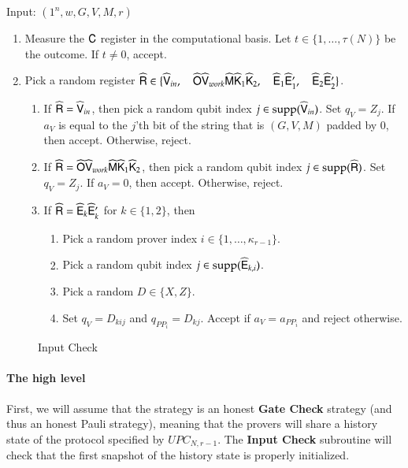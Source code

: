 \vspace{10pt}
\begin{center}
\begin{mdframed}
    Input: $(1^n,w,G,V,M,r)$ \\
	\begin{enumerate}
		\item Measure the ${\mathsf{C}}$ register in the computational basis. Let $t \in \{1,\ldots,\tau(N)\}$ be the outcome. If $t \neq 0$, accept.
		
		\item Pick a random register $\widehat{{\mathsf{R}}} \in \{ \widehat{{\mathsf{V}}}_{in}, \quad \widehat{{\mathsf{O}}} \widehat{{\mathsf{V}}}_{work} \widehat{{\mathsf{M}}} \widehat{{\mathsf{K}}}_1 \widehat{{\mathsf{K}}}_2, \quad \widehat{{\mathsf{E}}}_1 \widehat{{\mathsf{E}}}_1', \quad \widehat{{\mathsf{E}}}_2 \widehat{{\mathsf{E}}}_2' \}$.
		\begin{enumerate}
			\item If $\widehat{{\mathsf{R}}} = \widehat{{\mathsf{V}}}_{in}$, then pick a random qubit index $j \in \operatorname{supp}(\widehat{{\mathsf{V}}}_{in})$. Set $q_V = Z_j$. If $a_V$ is equal to the $j$'th bit of the string that is $(G,V,M)$ padded by $0$, then accept. Otherwise, reject.
			\item If $\widehat{{\mathsf{R}}} = \widehat{{\mathsf{O}}} \widehat{{\mathsf{V}}}_{work} \widehat{{\mathsf{M}}} \widehat{{\mathsf{K}}}_1 \widehat{{\mathsf{K}}}_2$, then pick a random qubit index $j \in \operatorname{supp}(\widehat{{\mathsf{R}}})$. Set $q_V = Z_j$. If $a_V = 0$, then accept. Otherwise, reject.
			\item If $\widehat{{\mathsf{R}}} = \widehat{{\mathsf{E}}}_k \widehat{{\mathsf{E}}}_k'$ for $k \in \{1,2\}$, then 
			\begin{enumerate}
				\item Pick a random prover index $i \in \{1,\ldots,\kappa_{r-1}\}$. 
				\item Pick a random qubit index $j \in \operatorname{supp}(\widehat{{\mathsf{E}}}_{k,i})$.
				\item Pick a random $D \in \{X,Z\}$.
				\item Set $q_V = D_{kij}$ and $q_{PP_i} = D_{kj}$. Accept if $a_V = a_{PP_i}$ and reject otherwise.
			\end{enumerate}
		\end{enumerate}
	\end{enumerate}    
\end{mdframed}
\end{center}
\begin{figure}[H]
\caption{Input Check}
\label{fig:input_check}
\end{figure}

\paragraph{The high level} First, we will assume that the strategy is an honest \textbf{Gate Check} strategy (and thus an honest Pauli strategy), meaning that the provers will share a history state of the protocol specified by $UPC_{N,r-1}$. The \textbf{Input Check} subroutine will check that the first snapshot of the history state is properly initialized.

